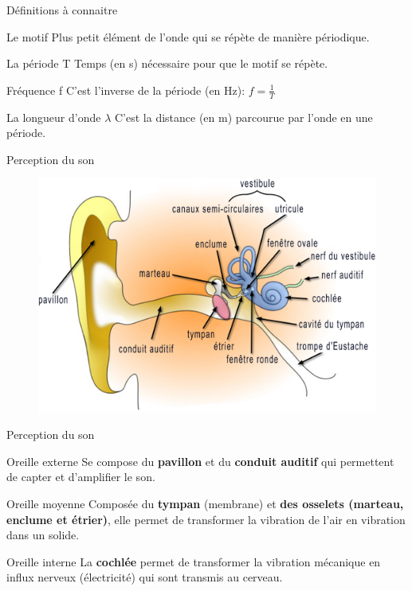 \documentclass{beamer}
\begin{document}
\begin{frame}{Définitions à connaitre}
	\begin{block}{Le motif}
		Plus petit élément de l'onde qui se répète de manière périodique.
	\end{block}
	\begin{alertblock}{La période T}
		Temps (en s) nécessaire pour que le motif se répète.
	\end{alertblock}
	\begin{exampleblock}{Fréquence f} 
		C'est l'inverse de la période (en Hz): $\boxed{f=\frac{1}{T}}$
		
		
		
	\end{exampleblock}
	\begin{alertblock}{La longueur d'onde $\lambda$}
		C'est la distance (en m) parcourue par l'onde en une période.
		
	\end{alertblock}
\end{frame}
\begin{frame}{Perception du son}
\begin{figure}
	\center
		\includegraphics[width=\textwidth]{OreilleHumaine.png}
\end{figure}
\end{frame}
\begin{frame}{Perception du son}
	\begin{block}{Oreille externe}
		Se compose du \textbf{pavillon} et du \textbf{conduit auditif} qui permettent de capter et d'amplifier le son.
	\end{block}
	\begin{exampleblock}{Oreille moyenne}
		Composée du \textbf{tympan} (membrane) et \textbf{des osselets (marteau, enclume et étrier)}, elle permet de transformer la vibration de l'air en vibration dans un solide.
	\end{exampleblock}
	\begin{alertblock}{Oreille interne}
		La \textbf{cochlée} permet de transformer la vibration mécanique en influx nerveux (électricité) qui sont transmis au cerveau.
	\end{alertblock}	
\end{frame}
\end{document}
